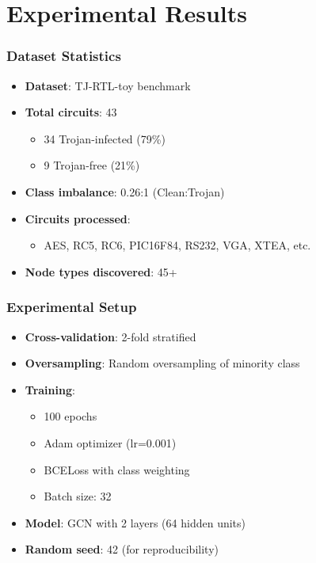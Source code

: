 \documentclass[aspectratio=169]{beamer}
\begin{document}
\section{Experimental Results}

\begin{frame}
\frametitle{Dataset Statistics}
\begin{itemize}
    \item \textbf{Dataset}: TJ-RTL-toy benchmark
    \item \textbf{Total circuits}: 43
    \begin{itemize}
        \item 34 Trojan-infected (79\%)
        \item 9 Trojan-free (21\%)
    \end{itemize}
    \item \textbf{Class imbalance}: 0.26:1 (Clean:Trojan)
    \item \textbf{Circuits processed}:
    \begin{itemize}
        \item AES, RC5, RC6, PIC16F84, RS232, VGA, XTEA, etc.
    \end{itemize}
    \item \textbf{Node types discovered}: 45+
\end{itemize}
\end{frame}

\begin{frame}
\frametitle{Experimental Setup}
\begin{itemize}
    \item \textbf{Cross-validation}: 2-fold stratified
    \item \textbf{Oversampling}: Random oversampling of minority class
    \item \textbf{Training}:
    \begin{itemize}
        \item 100 epochs
        \item Adam optimizer (lr=0.001)
        \item BCELoss with class weighting
        \item Batch size: 32
    \end{itemize}
    \item \textbf{Model}: GCN with 2 layers (64 hidden units)
    \item \textbf{Random seed}: 42 (for reproducibility)
\end{itemize}
\end{frame}
\end{document}
